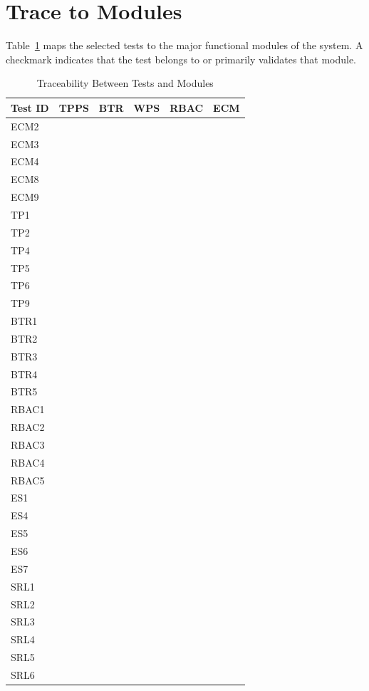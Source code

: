 \documentclass[12pt, titlepage]{article}
\newcommand{\cmark}{\checkmark}
\begin{document}
\section{Trace to Modules}

Table~\ref{tab:modtrace} maps the selected tests to the major functional
modules of the system. A checkmark indicates that the test belongs to or
primarily validates that module.

\begin{table}[p]
\centering
\caption{Traceability Between Tests and Modules}
\label{tab:modtrace}
\scriptsize
\setlength{\tabcolsep}{5pt}
\renewcommand{\arraystretch}{1.08}
\begin{tabular}{@{}l *{5}{c}@{}}
\toprule
\textbf{Test ID} & \textbf{TPPS} & \textbf{BTR} & \textbf{WPS} & \textbf{RBAC} & \textbf{ECM} \\
\midrule
ECM2 &  &  &  &  & \cmark \\
ECM3 &  &  &  &  & \cmark \\
ECM4 &  &  &  &  & \cmark \\
ECM8 &  & \cmark &  &  & \cmark \\
ECM9 &  &  &  &  & \cmark \\
TP1  & \cmark &  &  &  &  \\
TP2  & \cmark &  &  &  &  \\
TP4  & \cmark &  &  &  &  \\
TP5  & \cmark &  &  &  &  \\
TP6  & \cmark &  &  &  &  \\
TP9  & \cmark &  &  &  &  \\
BTR1 &  & \cmark &  &  & \cmark \\
BTR2 &  & \cmark &  &  & \cmark \\
BTR3 &  & \cmark &  &  &  \\
BTR4 &  & \cmark &  &  &  \\
BTR5 &  & \cmark &  &  &  \\
RBAC1 &  &  &  & \cmark & \cmark \\
RBAC2 &  &  &  & \cmark &  \\
RBAC3 & \cmark &  &  & \cmark &  \\
RBAC4 & \cmark &  &  & \cmark &  \\
RBAC5 &  &  &  & \cmark &  \\
\midrule
ES1  & \cmark &  &  &  &  \\
ES4  & \cmark &  &  &  &  \\
ES5  & \cmark &  &  &  &  \\
ES6  &  & \cmark &  &  &  \\
ES7  & \cmark &  &  &  &  \\
SRL1 & \cmark &  &  &  &  \\
SRL2 & \cmark &  &  &  &  \\
SRL3 & \cmark &  &  &  &  \\
SRL4 & \cmark &  &  &  &  \\
SRL5 & \cmark &  &  &  &  \\
SRL6 & \cmark &  &  &  &  \\
\bottomrule
\end{tabular}
\end{table}
\end{document}
